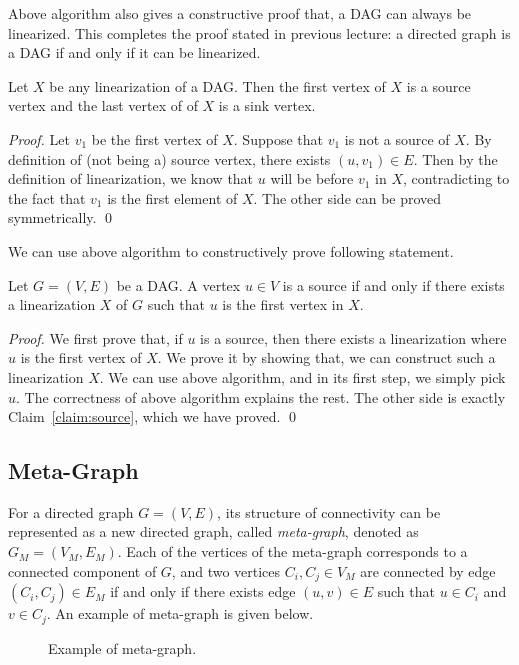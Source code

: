 Above algorithm also gives a constructive proof that, a DAG can always
be linearized. This completes the proof stated in previous lecture: a directed graph is a DAG if and only if it can be linearized.

\begin{claim}
Let $X$ be any linearization of a DAG. Then the first vertex of $X$ is a source vertex and 
the last vertex of of $X$ is a sink vertex.
\label{claim:source}
\end{claim}

\emph{Proof.} Let $v_1$ be the first vertex of $X$. Suppose that $v_1$ is not a source of $X$. 
By definition of (not being a) source vertex, there exists $(u,v_1)\in E$. Then by the definition
of linearization, we know that $u$ will be before $v_1$ in $X$, contradicting to the fact that
$v_1$ is the first element of $X$.
The other side can be proved symmetrically. \qed

We can use above algorithm to constructively prove following statement.

\begin{claim}
Let $G = (V, E)$ be a DAG. A vertex $u\in V$ is a source if and only if 
there exists a linearization $X$ of $G$ such that $u$ is the first vertex in $X$.
\end{claim}

\emph{Proof.} We first prove that, if $u$ is a source, then there exists a linearization
where $u$ is the first vertex of $X$. We prove it by showing that,
we can construct such a linearization $X$. We can use above algorithm,
and in its first step, we simply pick $u$. The correctness of above algorithm
explains the rest.  The other side is exactly Claim~\ref{claim:source}, which we have proved. \qed


\subsection*{Meta-Graph}

For a directed graph $G = (V,E)$, its structure of connectivity can be represented as a new
directed graph, called \emph{meta-graph}, denoted as $G_M = (V_M, E_M)$.
Each of the vertices of the meta-graph corresponds to a connected component of $G$,
and two vertices $C_i, C_j  \in V_M$ are connected by edge $(C_i, C_j) \in E_M$
if and only if there exists edge $(u,v)\in E$ such that $u\in C_i$ and $v\in C_j$.
An example of meta-graph is given below.

\begin{figure}[h!]
\centering{}
\caption{Example of meta-graph.}
\label{fig:meta-graph}
\end{figure}

